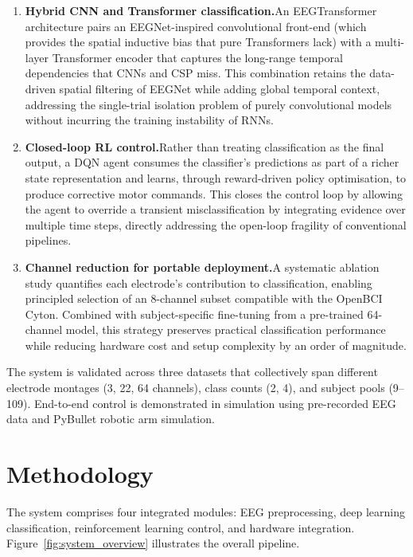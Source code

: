 \documentclass[12pt, a4paper]{article}
\begin{document}
\begin{enumerate}
    \item \textbf{Hybrid CNN and Transformer classification.}\quad An EEGTransformer architecture pairs an EEGNet-inspired convolutional front-end (which provides the spatial inductive bias that pure Transformers lack) with a multi-layer Transformer encoder that captures the long-range temporal dependencies that CNNs and CSP miss. This combination retains the data-driven spatial filtering of EEGNet while adding global temporal context, addressing the single-trial isolation problem of purely convolutional models without incurring the training instability of RNNs.

    \item \textbf{Closed-loop RL control.}\quad Rather than treating classification as the final output, a DQN agent consumes the classifier's predictions as part of a richer state representation and learns, through reward-driven policy optimisation, to produce corrective motor commands. This closes the control loop by allowing the agent to override a transient misclassification by integrating evidence over multiple time steps, directly addressing the open-loop fragility of conventional pipelines.

    \item \textbf{Channel reduction for portable deployment.}\quad A systematic ablation study quantifies each electrode's contribution to classification, enabling principled selection of an 8-channel subset compatible with the OpenBCI Cyton. Combined with subject-specific fine-tuning from a pre-trained 64-channel model, this strategy preserves practical classification performance while reducing hardware cost and setup complexity by an order of magnitude.
\end{enumerate}

The system is validated across three datasets that collectively span different electrode montages (3, 22, 64 channels), class counts (2, 4), and subject pools (9--109). End-to-end control is demonstrated in simulation using pre-recorded EEG data and PyBullet robotic arm simulation.

\section{Methodology}

The system comprises four integrated modules: EEG preprocessing, deep learning classification, reinforcement learning control, and hardware integration. Figure~\ref{fig:system_overview} illustrates the overall pipeline.
\end{document}

